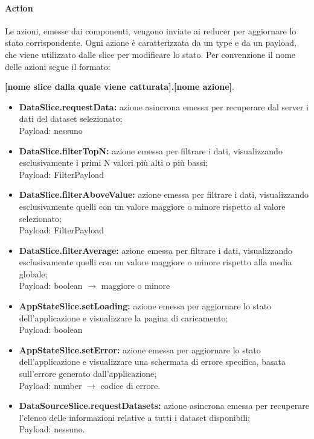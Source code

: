 \paragraph{Action}
    Le azioni, emesse dai componenti, vengono inviate ai reducer per aggiornare lo stato corrispondente.
    Ogni azione è caratterizzata da un type e da un payload, che viene utilizzato dalle slice per modificare lo stato.
    Per convenzione il nome delle azioni segue il formato: \\
    \begin{center}
        \textbf{[nome slice dalla quale viene catturata].[nome azione]}.
    \end{center}
    \begin{itemize}
        \item \textbf{DataSlice.requestData:} azione asincrona emessa per recuperare dal server i dati del dataset selezionato; \\ Payload: nessuno
        \item \textbf{DataSlice.filterTopN:} azione emessa per filtrare i dati, visualizzando esclusivamente i primi N valori più alti o più bassi; \\ Payload: FilterPayload
        \item \textbf{DataSlice.filterAboveValue:} azione emessa per filtrare i dati, visualizzando esclusivamente quelli con un valore maggiore o minore rispetto al valore selezionato;\\ Payload: FilterPayload
        \item \textbf{DataSlice.filterAverage:} azione emessa per filtrare i dati, visualizzando esclusivamente quelli con un valore maggiore o minore rispetto alla media globale; \\ Payload: boolean $\rightarrow$ maggiore o minore
        \item \textbf{AppStateSlice.setLoading:} azione emessa per aggiornare lo stato dell'applicazione e visualizzare la pagina di caricamento; \\ Payload: boolean
        \item \textbf{AppStateSlice.setError:} azione emessa per aggiornare lo stato dell'applicazione e visualizzare una schermata di errore specifica, basata sull'errore generato dall'applicazione; \\ Payload: number $\rightarrow$ codice di errore.
        \item \textbf{DataSourceSlice.requestDatasets:} azione asincrona emessa per recuperare l'elenco delle informazioni relative a tutti i dataset disponibili; \\ Payload: nessuno.

\end{itemize}
